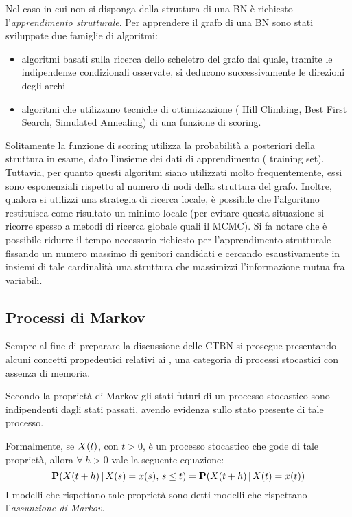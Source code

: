 Nel caso in cui non si disponga della struttura di una \acs{BN} è richiesto l'\emph{apprendimento strutturale}. Per apprendere il grafo di una \acl{BN} sono stati sviluppate due famiglie di algoritmi:
\begin{itemize}
    \item algoritmi basati sulla ricerca dello scheletro del grafo dal quale, tramite le indipendenze condizionali osservate, si deducono successivamente le direzioni degli archi
    \item algoritmi che utilizzano tecniche di ottimizzazione (\eg{} Hill Climbing, Best First Search, Simulated Annealing) di una funzione di scoring.
\end{itemize}
Solitamente la funzione di scoring utilizza la probabilità a posteriori della struttura in esame, dato l'insieme dei dati di apprendimento (\ie{} training set). Tuttavia, per quanto questi algoritmi siano utilizzati molto frequentemente, essi sono esponenziali rispetto al numero di nodi della struttura del grafo. Inoltre, qualora si utilizzi una strategia di ricerca locale, è possibile che l'algoritmo restituisca come risultato un minimo locale (per evitare questa situazione si ricorre spesso a metodi di ricerca globale quali il \acs{MCMC}). Si fa notare che è possibile ridurre il tempo necessario richiesto per l'apprendimento strutturale fissando un numero massimo di genitori candidati e cercando esaustivamente in insiemi di tale cardinalità una struttura che massimizzi l'informazione mutua fra variabili.

\subsection{Processi di Markov}
\label{sec:mps}

Sempre al fine di preparare la discussione delle \acl{CTBN} si prosegue presentando alcuni concetti propedeutici relativi ai \mprocess{}, una categoria di processi stocastici con assenza di memoria.

\begin{definizione}
\label{defn:markov-assumption}
Secondo la proprietà di Markov gli stati futuri di un processo stocastico sono indipendenti dagli stati passati, avendo evidenza sullo stato presente di tale processo.

Formalmente, se $\mathnormal{X}(t)$, con $t > 0$, è un processo stocastico che gode di tale proprietà, allora $\forall\:h > 0$ vale la seguente equazione:
\begin{equation}
\label{eq:markov-assumption}
\mathbf{P}(\mathnormal{X}(t + h)\,\arrowvert\,\mathnormal{X}(s)=x(s),\,s\leq t)=\mathbf{P}(\mathnormal{X}(t + h)\,\arrowvert\,\mathnormal{X}(t)=x(t))
\end{equation}
I modelli che rispettano tale proprietà sono detti modelli che rispettano l'\emph{assunzione di Markov}.
\end{definizione}

